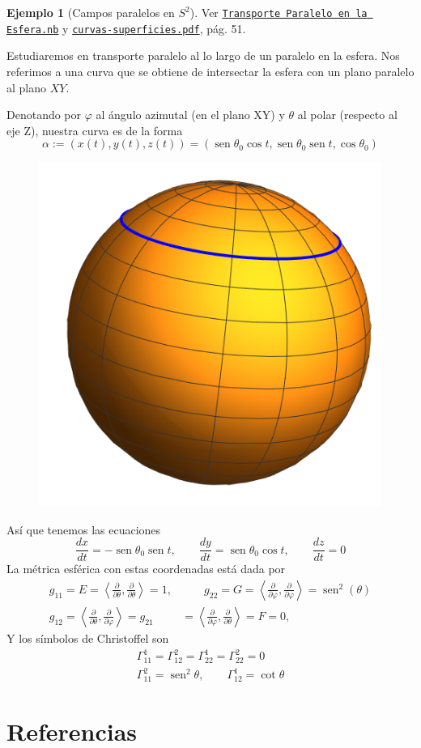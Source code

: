 \documentclass[spanish]{book}
\theoremstyle{definition}
\newtheorem*{ejem}{Ejemplo}
\DeclareMathOperator{\sen}{sen}
\begin{document}
	\begin{ejem}[Campos paralelos en $S^2$]
		
		
		Ver \href{https://github.com/danimalabares/geo-riem/blob/main/Transporte%20Paralelo%20en%20la%20Esfera.nb}{\texttt{Transporte Paralelo en la Esfera.nb}} y \href{https://github.com/danimalabares/curvas-superficies/blob/main/curvas-superficies.pdf}{\texttt{curvas-superficies.pdf}}, pág. 51.
		
		Estudiaremos en transporte paralelo al lo largo de un paralelo en la esfera. Nos referimos a una curva que se obtiene de intersectar la esfera con un plano paralelo al plano $XY$.
		
		Denotando por $\varphi$ al ángulo azimutal (en el plano XY) y $\theta$ al polar (respecto al eje Z), nuestra curva es de la forma
		\[\alpha:=(x(t),y(t),z(t))=(\sen\theta_0\cos t,\sen\theta_0\sen t,\cos\theta_0)\]
		\begin{figure}[H]
			\centering
			\includegraphics[width=0.4\linewidth]{fig14}
			\label{fig:fig14}
		\end{figure}
		
		Así que tenemos las ecuaciones
		\[\frac{dx}{dt}=-\sen\theta_0\sen t,\qquad\frac{dy}{dt}=\sen\theta_0\cos t,\qquad\frac{dz}{dt}=0\]
	La métrica esférica con estas coordenadas está dada por
		\begin{align*}
		g_{11}=E=\left\langle \frac{\partial}{\partial \theta},\frac{\partial}{\partial \theta}\right\rangle=1,&\qquad g_{22}=G=\left\langle \frac{\partial}{\partial \varphi},\frac{\partial}{\partial \varphi}\right\rangle=\sen^2(\theta)\\
		g_{12}=\left\langle \frac{\partial}{\partial \theta},\frac{\partial}{\partial \varphi}\right\rangle=g_{21}&=\left\langle \frac{\partial}{\partial \varphi},\frac{\partial}{\partial \theta}\right\rangle=F=0,
	\end{align*}
	Y los símbolos de Christoffel son
	\begin{align*}
		\Gamma_{11}^1=\Gamma^2_{12}=\Gamma^1_{22}=\Gamma_{22}^2=0\\
		\Gamma^2_{11}=\sen^2\theta,\qquad \Gamma_{12}^1=\cot\theta
	\end{align*}
	\end{ejem}
	
	\chapter{Referencias}
	\printbibliography[heading=none]
	
\end{document}
